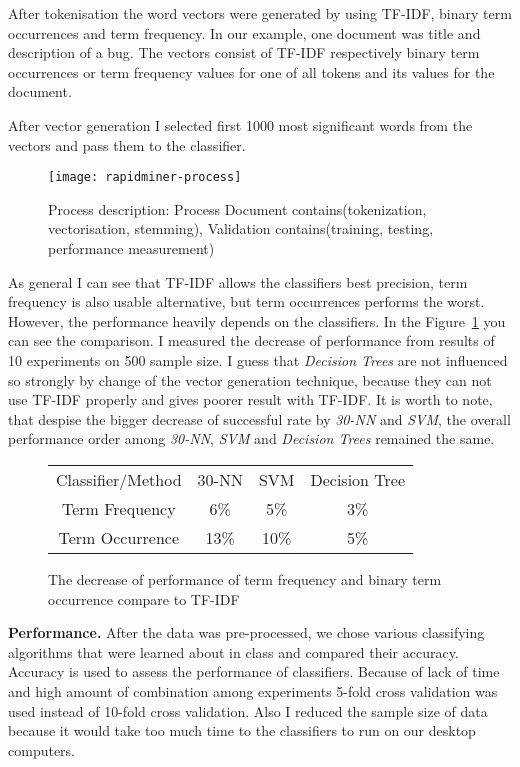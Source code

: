 After tokenisation the word vectors were generated by using TF-IDF, binary term occurrences and term frequency.
In our example, one document was title and description of a bug.
The vectors consist of TF-IDF respectively binary term occurrences or term frequency values for one of all tokens and its values for the document.

After vector generation I selected first 1000 most significant words from the vectors and pass them to the classifier.

\begin{figure}
\begin{center} 
\texttt{[image: rapidminer-process]}
\caption{Process description: Process Document contains(tokenization, vectorisation, stemming), Validation contains(training, testing, performance measurement)}
\end{center}
\end{figure}
As general I can see that TF-IDF allows the classifiers best precision, term frequency is also usable alternative, but term occurrences performs the worst.
However, the performance heavily depends on the classifiers.
In the Figure~\ref{fig:vectors} you can see the comparison. 
I measured the decrease of performance from results of 10 experiments on 500 sample size.
I guess that {\it Decision Trees} are not influenced so strongly by change of the vector generation
technique, because they can not use TF-IDF properly and gives poorer result with TF-IDF.
It is worth to note, that despise the bigger decrease of successful rate by {\it 30-NN} and {\it SVM},
the overall performance order among {\it 30-NN}, {\it SVM} and {\it Decision Trees} remained the same.
\begin{figure}
\begin{center}
\begin{tabular}{|c|c|c|c|}
\hline
Classifier/Method     & 30-NN  & SVM &  Decision Tree   \\
Term Frequency        & 6\%    & 5\% &    3\%  \\
Term Occurrence       & 13\%   & 10\% &   5\%  \\
\hline
\end{tabular}
\caption{\label{fig:vectors} The decrease of performance of term frequency and binary term occurrence compare to TF-IDF}
\end{center}
\end{figure}

{\bf Performance.} After the data was pre-processed, we chose various classifying algorithms that were learned about in class and compared their accuracy. Accuracy is used to assess the performance of classifiers. Because of lack of time and high amount of combination among experiments 5-fold cross validation was used instead of 10-fold cross validation. Also I reduced the sample size of data because it would take too much time to the classifiers to run on our desktop computers.

